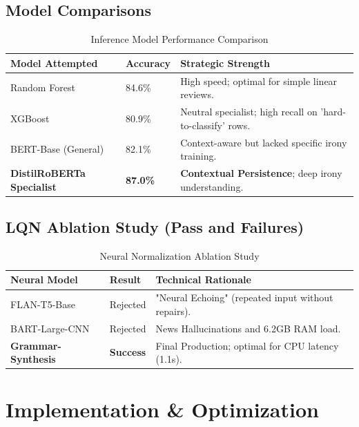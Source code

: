 \documentclass[11pt,oneside]{scrbook}
\begin{document}
\section{Model Comparisons}
\begin{table}[h]
\centering
\begin{tabularx}{\textwidth}{p{4cm} p{2cm} X}
\toprule
\textbf{Model Attempted} & \textbf{Accuracy} & \textbf{Strategic Strength} \\
\midrule
Random Forest & 84.6\% & High speed; optimal for simple linear reviews. \\
XGBoost & 80.9\% & Neutral specialist; high recall on 'hard-to-classify' rows. \\
BERT-Base (General) & 82.1\% & Context-aware but lacked specific irony training. \\
\textbf{DistilRoBERTa Specialist} & \textbf{87.0\%} & \textbf{Contextual Persistence}; deep irony understanding. \\
\bottomrule
\end{tabularx}
\caption{Inference Model Performance Comparison}
\end{table}

\section{LQN Ablation Study (Pass and Failures)}
\begin{table}[h]
\centering
\begin{tabularx}{\textwidth}{p{4cm} p{2.5cm} X}
\toprule
\textbf{Neural Model} & \textbf{Result} & \textbf{Technical Rationale} \\
\midrule
FLAN-T5-Base & Rejected & "Neural Echoing" (repeated input without repairs). \\
BART-Large-CNN & Rejected & News Hallucinations and 6.2GB RAM load. \\
\textbf{Grammar-Synthesis} & \textbf{Success} & Final Production; optimal for CPU latency (1.1s). \\
\bottomrule
\end{tabularx}
\caption{Neural Normalization Ablation Study}
\end{table}

\cleardoublepage
\chapter{Implementation \& Optimization}
\end{document}

